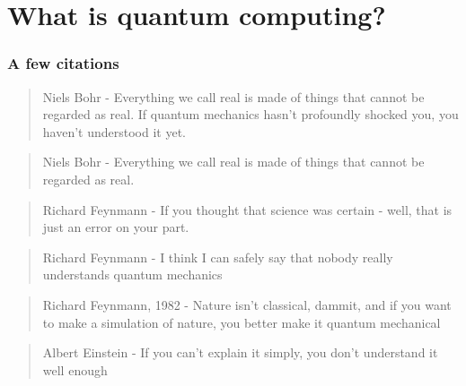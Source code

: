
\section{What is quantum computing?}

\begin{frame}[plain]
\frametitle{A few  citations}

\begin{quotation}{Niels Bohr - }
    Everything we call real is made of things that cannot be regarded as real. If quantum mechanics hasn't profoundly 
    shocked you, you haven't understood it yet.
\end{quotation}

\begin{quotation}{Niels Bohr - }
    Everything we call real is made of things that cannot be regarded as real.
\end{quotation}

\begin{quotation}{Richard Feynmann - }
    If you thought that science was certain - well, that is just an error on your part.
\end{quotation}

\begin{quotation}{Richard Feynmann - }
    I think I can safely say that nobody really understands quantum mechanics
\end{quotation}

\begin{quotation}{Richard Feynmann, 1982 - }
    Nature isn’t classical, dammit, and if you want to make a simulation of nature, you better 	
    make it quantum mechanical
\end{quotation}

\begin{quotation}{Albert Einstein - }
    If you can't explain it simply, you don't understand it well enough
\end{quotation}

\end{frame}


